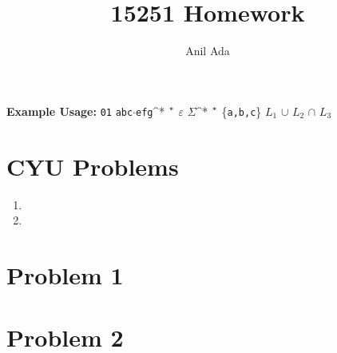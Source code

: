 \documentclass[11pt,letterpaper]{article}
\title{15251 Homework \pset}
\author{Anil Ada}%
\newcommand{\prob}[1]{\clearpage\section*{Problem #1}}
\newcommand{\str}{\verb}
\newcommand{\empStr}{{\ifmmode \varepsilon \else $\varepsilon$ \fi}}
\newcommand{\cat}{{\ifmmode \cdot \else $\cdot$\fi}}
\newcommand{\starOp}{{\ifmmode ^* \else $\vphantom{1}^*$ \fi}}
\newcommand{\albet}{{\ifmmode \Sigma \else $\Sigma$\fi}}
\newcommand{\union}{{\ifmmode \cup \else$\cup$ \fi}}
\newcommand{\intersect}{{{\ifmmode \cap \else$\cap$ \fi}}}
\begin{document}
\maketitle

\noindent \textbf{Example Usage:} \str|01| \str|abc|\cat\str|efg|\starOp \empStr \albet\starOp \{\str|a,b,c|\} $L_1$ \union $L_2$ \intersect $L_3$



\section*{CYU Problems}
\begin{enumerate}
\item %
\item 
\end{enumerate}


\prob{1}
\prob{2}

\end{document}
